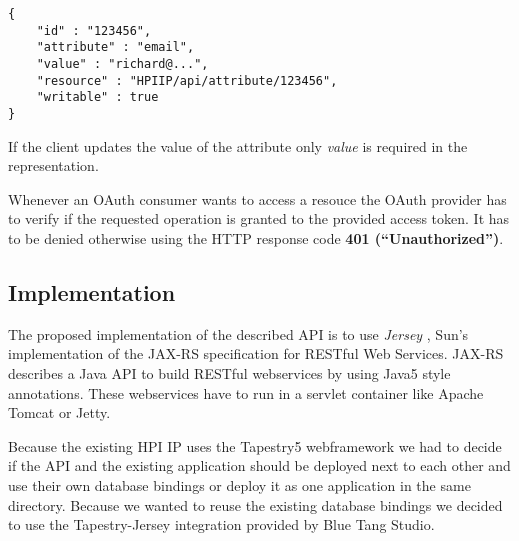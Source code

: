 \begin{verbatim}
{
    "id" : "123456",
    "attribute" : "email",
    "value" : "richard@...",
    "resource" : "HPIIP/api/attribute/123456",
    "writable" : true
}
\end{verbatim}
If the client updates the value of the attribute only 
\emph{value} is required in the representation.

Whenever an OAuth consumer wants to access a resouce the OAuth
provider has to verify if the requested operation is granted to the
provided access token. It has to be denied otherwise using the HTTP
response code \textbf{401 (``Unauthorized'')}.

\subsection{Implementation}

The proposed implementation of the described API is to use
\emph{Jersey} \cite{sun-jersey}, Sun's implementation of the JAX-RS specification for RESTful Web Services. \cite{jax-rs} 
JAX-RS describes a Java API to build RESTful webservices by using
Java5 style annotations. These webservices have to run in a servlet
container like Apache Tomcat or Jetty.

Because the existing HPI IP uses the Tapestry5 webframework we had
to decide if the API and the existing application should be
deployed next to each other and use their own database bindings or
deploy it as one application in the same directory. Because we
wanted to reuse the existing database bindings we decided to use
the Tapestry-Jersey integration provided by Blue Tang
Studio. \cite{yunglin-source} \cite{yunglin-wiki}  
